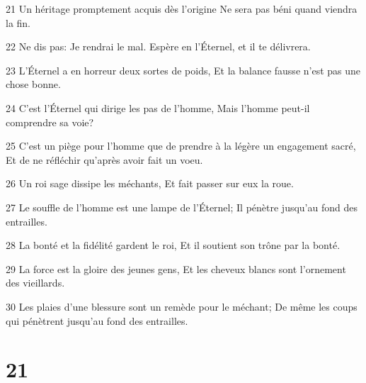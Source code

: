 \par 21 Un héritage promptement acquis dès l'origine Ne sera pas béni quand viendra la fin.
\par 22 Ne dis pas: Je rendrai le mal. Espère en l'Éternel, et il te délivrera.
\par 23 L'Éternel a en horreur deux sortes de poids, Et la balance fausse n'est pas une chose bonne.
\par 24 C'est l'Éternel qui dirige les pas de l'homme, Mais l'homme peut-il comprendre sa voie?
\par 25 C'est un piège pour l'homme que de prendre à la légère un engagement sacré, Et de ne réfléchir qu'après avoir fait un voeu.
\par 26 Un roi sage dissipe les méchants, Et fait passer sur eux la roue.
\par 27 Le souffle de l'homme est une lampe de l'Éternel; Il pénètre jusqu'au fond des entrailles.
\par 28 La bonté et la fidélité gardent le roi, Et il soutient son trône par la bonté.
\par 29 La force est la gloire des jeunes gens, Et les cheveux blancs sont l'ornement des vieillards.
\par 30 Les plaies d'une blessure sont un remède pour le méchant; De même les coups qui pénètrent jusqu'au fond des entrailles.

\chapter{21}

